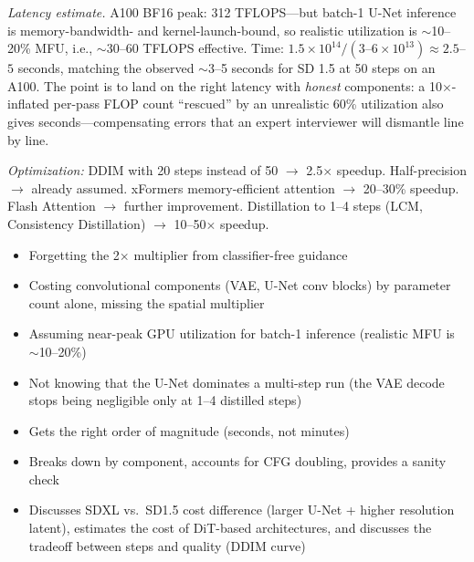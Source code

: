 \begin{interviewq}
\textit{Latency estimate.} A100 BF16 peak: 312 TFLOPS---but batch-1 U-Net inference is memory-bandwidth- and kernel-launch-bound, so realistic utilization is $\sim$10--20\% MFU, i.e., $\sim$30--60 TFLOPS effective. Time: $1.5 \times 10^{14} / (3\text{--}6 \times 10^{13}) \approx 2.5$--$5$ seconds, matching the observed $\sim$3--5 seconds for SD 1.5 at 50 steps on an A100. The point is to land on the right latency with \textit{honest} components: a 10$\times$-inflated per-pass FLOP count ``rescued'' by an unrealistic 60\% utilization also gives seconds---compensating errors that an expert interviewer will dismantle line by line.

\textit{Optimization:} DDIM with 20 steps instead of 50 $\to$ 2.5$\times$ speedup. Half-precision $\to$ already assumed. xFormers memory-efficient attention $\to$ 20--30\% speedup. Flash Attention $\to$ further improvement. Distillation to 1--4 steps (LCM, Consistency Distillation) $\to$ 10--50$\times$ speedup.

\redflags
\begin{itemize}
    \item Forgetting the 2$\times$ multiplier from classifier-free guidance
    \item Costing convolutional components (VAE, U-Net conv blocks) by parameter count alone, missing the spatial multiplier
    \item Assuming near-peak GPU utilization for batch-1 inference (realistic MFU is $\sim$10--20\%)
    \item Not knowing that the U-Net dominates a multi-step run (the VAE decode stops being negligible only at 1--4 distilled steps)
\end{itemize}


\goodgreat
\begin{itemize}
    \item {} Gets the right order of magnitude (seconds, not minutes)
    \item {} Breaks down by component, accounts for CFG doubling, provides a sanity check
    \item {} Discusses SDXL vs.\ SD1.5 cost difference (larger U-Net + higher resolution latent), estimates the cost of DiT-based architectures, and discusses the tradeoff between steps and quality (DDIM curve)
\end{itemize}

\end{interviewq}

